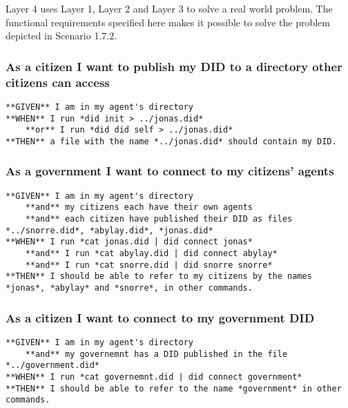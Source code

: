 Layer 4 uses Layer 1, Layer 2 and Layer 3 to solve a real world problem.
The functional requirements specified here makes it possible to solve
the problem depicted in Scenario 1.7.2.

\hypertarget{as-a-citizen-i-want-to-publish-my-did-to-a-directory-other-citizens-can-access}{%
\subsubsection{As a citizen I want to publish my DID to a directory
other citizens can
access}\label{as-a-citizen-i-want-to-publish-my-did-to-a-directory-other-citizens-can-access}}

\begin{lstlisting}
**GIVEN** I am in my agent's directory
**WHEN** I run *did init > ../jonas.did*
    **or** I run *did did self > ../jonas.did*
**THEN** a file with the name *../jonas.did* should contain my DID.
\end{lstlisting}

\hypertarget{as-a-government-i-want-to-connect-to-my-citizens-agents}{%
\subsubsection{As a government I want to connect to my citizens'
agents}\label{as-a-government-i-want-to-connect-to-my-citizens-agents}}

\begin{lstlisting}
**GIVEN** I am in my agent's directory
    **and** my citizens each have their own agents
    **and** each citizen have published their DID as files *../snorre.did*, *abylay.did*, *jonas.did*
**WHEN** I run *cat jonas.did | did connect jonas*
    **and** I run *cat abylay.did | did connect abylay*
    **and** I run *cat snorre.did | did snorre snorre*
**THEN** I should be able to refer to my citizens by the names *jonas*, *abylay* and *snorre*, in other commands.
\end{lstlisting}

\hypertarget{as-a-citizen-i-want-to-connect-to-my-government-did}{%
\subsubsection{As a citizen I want to connect to my government
DID}\label{as-a-citizen-i-want-to-connect-to-my-government-did}}

\begin{lstlisting}
**GIVEN** I am in my agent's directory
    **and** my governemnt has a DID published in the file *../government.did*
**WHEN** I run *cat governemnt.did | did connect government*
**THEN** I should be able to refer to the name *government* in other commands.
\end{lstlisting}

